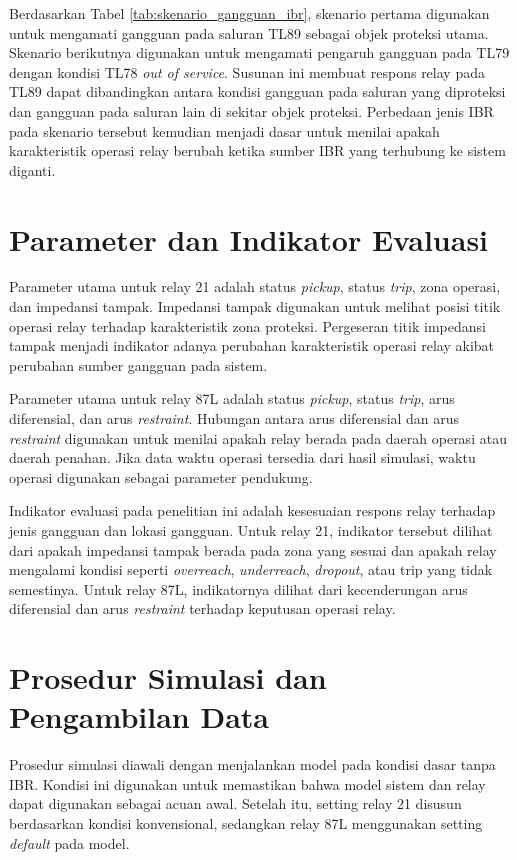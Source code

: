 Berdasarkan Tabel \ref{tab:skenario_gangguan_ibr}, skenario pertama digunakan untuk mengamati gangguan pada saluran TL89 sebagai objek proteksi utama. Skenario berikutnya digunakan untuk mengamati pengaruh gangguan pada TL79 dengan kondisi TL78 \textit{out of service}. Susunan ini membuat respons relay pada TL89 dapat dibandingkan antara kondisi gangguan pada saluran yang diproteksi dan gangguan pada saluran lain di sekitar objek proteksi. Perbedaan jenis IBR pada skenario tersebut kemudian menjadi dasar untuk menilai apakah karakteristik operasi relay berubah ketika sumber IBR yang terhubung ke sistem diganti.

\section{Parameter dan Indikator Evaluasi}

Parameter utama untuk relay 21 adalah status \textit{pickup}, status \textit{trip}, zona operasi, dan impedansi tampak. Impedansi tampak digunakan untuk melihat posisi titik operasi relay terhadap karakteristik zona proteksi. Pergeseran titik impedansi tampak menjadi indikator adanya perubahan karakteristik operasi relay akibat perubahan sumber gangguan pada sistem.

Parameter utama untuk relay 87L adalah status \textit{pickup}, status \textit{trip}, arus diferensial, dan arus \textit{restraint}. Hubungan antara arus diferensial dan arus \textit{restraint} digunakan untuk menilai apakah relay berada pada daerah operasi atau daerah penahan. Jika data waktu operasi tersedia dari hasil simulasi, waktu operasi digunakan sebagai parameter pendukung.

Indikator evaluasi pada penelitian ini adalah kesesuaian respons relay terhadap jenis gangguan dan lokasi gangguan. Untuk relay 21, indikator tersebut dilihat dari apakah impedansi tampak berada pada zona yang sesuai dan apakah relay mengalami kondisi seperti \textit{overreach}, \textit{underreach}, \textit{dropout}, atau trip yang tidak semestinya. Untuk relay 87L, indikatornya dilihat dari kecenderungan arus diferensial dan arus \textit{restraint} terhadap keputusan operasi relay.

\section{Prosedur Simulasi dan Pengambilan Data}

Prosedur simulasi diawali dengan menjalankan model pada kondisi dasar tanpa IBR. Kondisi ini digunakan untuk memastikan bahwa model sistem dan relay dapat digunakan sebagai acuan awal. Setelah itu, setting relay 21 disusun berdasarkan kondisi konvensional, sedangkan relay 87L menggunakan setting \textit{default} pada model.

